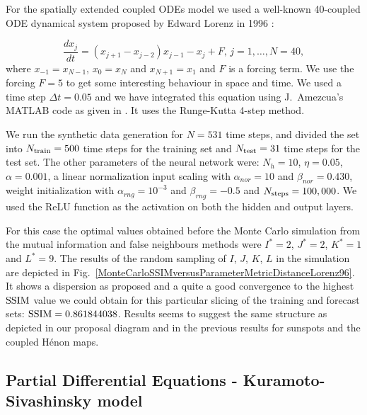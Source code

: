 \documentclass[journal]{IEEEtran}
\begin{document}
For the spatially extended coupled ODEs model we used a well-known 40-coupled ODE dynamical system proposed by Edward Lorenz in 1996 
\cite{articleLorenz96}:

\begin{equation}
\label{lorenz96equations}
\frac{dx_j}{dt}=\left( x_{j+1} - x_{j-2} \right ) x_{j-1} - x_j + F, \, j=1,\ldots,N=40,
\end{equation}
where $x_{-1}=x_{N-1}$, $x_0=x_N$ and $x_{N+1}=x_1$ and $F$ is a forcing term. 
We use the forcing $F=5$ to get some interesting behaviour in space and time. We used a time step $\Delta t=0.05$ and 
we have integrated this equation using J.\ Amezcua's MATLAB code as given in \cite{BibEntry2018Apr}. It uses the 
Runge-Kutta 4-step method.



We run the synthetic data generation for $N=531$ time steps, and divided the set into $N_{\textnormal{train}}=500$ time steps for the training set
and $N_{\textnormal{test}}=31$ time steps for the test set. The other parameters of the neural network were:
$N_h=10$, $\eta=0.05$, $\alpha=0.001$, a linear normalization input scaling with $\alpha_{nor} = 10$ and $\beta_{nor} = 0.430$, 
weight initialization with $\alpha_{rng} = 10^{-3}$ and $\beta_{rng} = -0.5$ and $N_{\textnormal{steps}}=100,000$. 
We used the ReLU function as the activation on both the hidden and output layers.

For this case the optimal values obtained before the Monte Carlo simulation from the mutual information and false neighbours methods 
were $I^*=2$, $J^*=2$, $K^*=1$ and $L^*=9$. The results of the random sampling of $I$, $J$, $K$, $L$ in the simulation
are depicted in Fig.\ \ref{MonteCarloSSIMversusParameterMetricDistanceLorenz96}.  It shows a dispersion as proposed and a quite a good
convergence to the highest 
$\textnormal{SSIM}$ value we could obtain for this particular slicing of the training and forecast sets: $\textnormal{SSIM}=
0.861844038$. Results seems to suggest the same structure as depicted in our proposal diagram and in the previous results for sunspots
and the coupled H\'{e}non maps.

\subsection{Partial Differential Equations - Kuramoto-Sivashinsky model}
\end{document}
